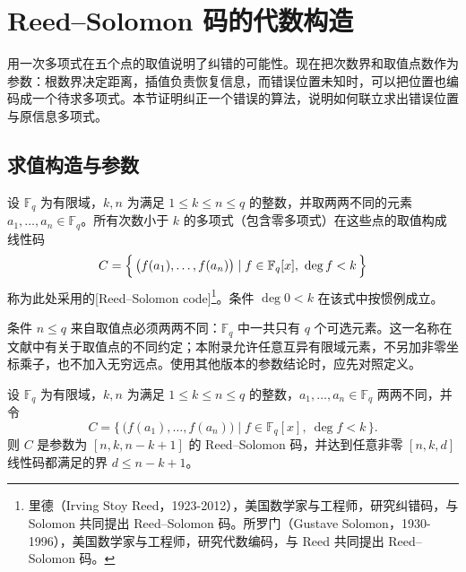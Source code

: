 
\section{Reed–Solomon 码的代数构造}
\label{b1:sec:B03}

用一次多项式在五个点的取值说明了纠错的可能性。现在把次数界和取值点数作为参数：根数界决定距离，插值负责恢复信息，而错误位置未知时，可以把位置也编码成一个待求多项式。本节证明纠正一个错误的算法，说明如何联立求出错误位置与原信息多项式。

\subsection{求值构造与参数}
\label{b1:subsec:B03:01}

\begin{definition}\label{b1:def:B-reed-solomon}
	设 \(\mathbb F_q\) 为有限域，\(k,n\) 为满足 \(1\leq k\leq n\leq q\) 的整数，并取两两不同的元素 \(a_1,\ldots,a_n\in\mathbb F_q\)。所有次数小于 \(k\) 的多项式（包含零多项式）在这些点的取值构成线性码
	\[
		C=\Bigl\{\,\bigl(f(a_1),\ldots,f(a_n)\bigr)\mid f\in\mathbb F_q[x],\ \deg f<k\,\Bigr\}
	\]
	称为此处采用的[Reed–Solomon code]\footnote{里德（Irving Stoy Reed，1923-2012），美国数学家与工程师，研究纠错码，与 Solomon 共同提出 Reed--Solomon 码。所罗门（Gustave Solomon，1930-1996），美国数学家与工程师，研究代数编码，与 Reed 共同提出 Reed--Solomon 码。}。条件 \(\deg0<k\) 在该式中按惯例成立。
\end{definition}

条件 \(n\leq q\) 来自取值点必须两两不同：\(\mathbb F_q\) 中一共只有 \(q\) 个可选元素。这一名称在文献中有关于取值点的不同约定；本附录允许任意互异有限域元素，不另加非零坐标乘子，也不加入无穷远点。使用其他版本的参数结论时，应先对照定义。

\begin{theorem}\label{b1:thm:B-rs-parameters}
	设 \(\mathbb F_q\) 为有限域，\(k,n\) 为满足 \(1\leq k\leq n\leq q\) 的整数，\(a_1,\ldots,a_n\in\mathbb F_q\) 两两不同，并令
	\[
		C=\{\,\bigl(f(a_1),\ldots,f(a_n)\bigr)\mid f\in\mathbb F_q[x],\ \deg f<k\,\}.
	\]
	则 \(C\) 是参数为 \([n,k,n-k+1]\) 的 Reed--Solomon 码，并达到任意非零 \([n,k,d]\) 线性码都满足的界 \(d\leq n-k+1\)。
\end{theorem}

